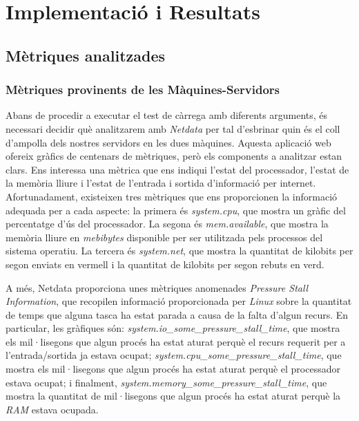 \chapter{Implementació i Resultats}

\section{Mètriques analitzades}

\subsection{Mètriques provinents de les Màquines-Servidors}

Abans de procedir a executar el test de càrrega amb diferents arguments, és necessari decidir què analitzarem amb \textit{Netdata} per tal d'esbrinar quin és el coll d'ampolla dels nostres servidors en les dues màquines. Aquesta aplicació web ofereix gràfics de centenars de mètriques, però els components a analitzar estan clars. Ens interessa una mètrica que ens indiqui l'estat del processador, l'estat de la memòria lliure i l'estat de l'entrada i sortida d'informació per internet. Afortunadament, existeixen tres mètriques que ens proporcionen la informació adequada per a cada aspecte: la primera és \textit{system.cpu}, que mostra un gràfic del percentatge d'ús del processador. La segona és \textit{mem.available}, que mostra la memòria lliure en \textit{mebibytes} disponible per ser utilitzada pels processos del sistema operatiu. La tercera és \textit{system.net}, que mostra la quantitat de kilobits per segon enviats en vermell i la quantitat de kilobits per segon rebuts en verd.

A més, Netdata proporciona unes mètriques anomenades \textit{Pressure Stall Information}\cite{noauthor_pressure_2024}, que recopilen informació proporcionada per \textit{Linux} sobre la quantitat de temps que alguna tasca ha estat parada a causa de la falta d'algun recurs\cite{weiner_psi_2018}. En particular, les gràfiques són: \textit{system.io\_some\_pressure\_stall\_time}, que mostra els mil·lisegons que algun procés ha estat aturat perquè el recurs requerit per a l'entrada/sortida ja estava ocupat; \textit{system.cpu\_some\_pressure\_stall\_time}, que mostra els mil·lisegons que algun procés ha estat aturat perquè el processador estava ocupat; i finalment, \textit{system.memory\_some\_pressure\_stall\_time}, que mostra la quantitat de mil·lisegons que algun procés ha estat aturat perquè la \textit{RAM} estava ocupada.

